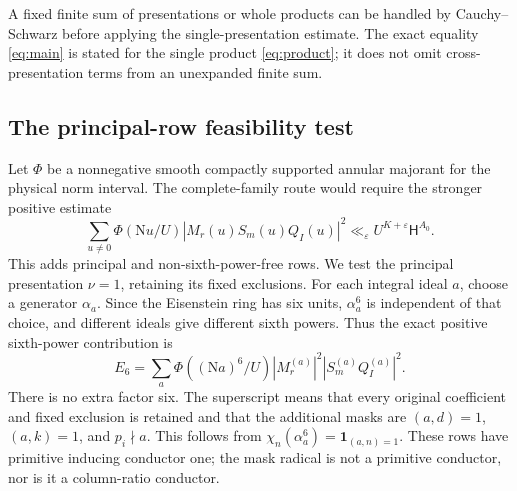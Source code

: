 \documentclass[11pt]{article}
\theoremstyle{definition}
\theoremstyle{remark}
\numberwithin{equation}{section}
\newcommand{\Nm}{\mathrm N}
\newcommand{\HH}{\mathsf H}
\newcommand{\ind}{\mathbf1}
\newcommand{\ee}{\varepsilon}
\begin{document}
A fixed finite sum of presentations or whole products can be handled
by Cauchy--Schwarz before applying the single-presentation estimate.
The exact equality \eqref{eq:main} is stated for the single product
\eqref{eq:product}; it does not omit cross-presentation terms from an
unexpanded finite sum.

\subsection{The principal-row feasibility test}\label{sec:selector-test}

Let $\Phi$ be a nonnegative smooth compactly supported annular
majorant for the physical norm interval. The complete-family route
would require the stronger positive estimate
\begin{equation}\label{eq:complete-enlargement}
\sum_{u\ne0}\Phi(\Nm u/U)|M_r(u)S_m(u)Q_I(u)|^2
\ll_\ee U^{K+\ee}\HH^{A_0}.
\end{equation}
This adds principal and non-sixth-power-free rows. We test the
principal presentation $\nu=1$, retaining its fixed exclusions.
For each integral ideal $a$, choose a generator $\alpha_a$. Since
the Eisenstein ring has six units, $\alpha_a^6$ is independent of
that choice, and different ideals give different sixth powers.
Thus the exact positive sixth-power contribution is
\begin{equation}\label{eq:sixth-layer}
E_6=\sum_a\Phi((\Nm a)^6/U)
 |M_r^{(a)}|^2|S_m^{(a)}Q_I^{(a)}|^2.
\end{equation}
There is no extra factor six. The superscript means that every
original coefficient and fixed exclusion is retained and that the
additional masks are $(a,d)=1$, $(a,k)=1$, and $p_i\nmid a$.
This follows from $\chi_n(\alpha_a^6)=\ind_{(a,n)=1}$.
These rows have primitive inducing conductor one; the mask radical
is not a primitive conductor, nor is it a column-ratio conductor.
\end{document}
